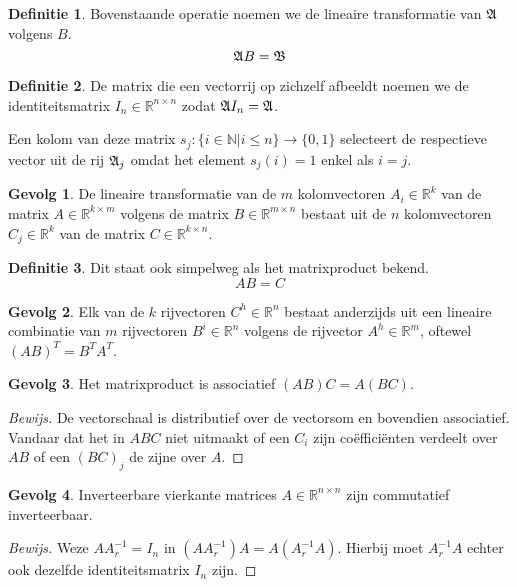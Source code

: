 \documentclass{amsart}
\theoremstyle{definition}
\newtheorem{dfn}{Definitie}[section]
\newtheorem{csq}{Gevolg}[section]
\newenvironment{bewijs}{\begin{proof}[Bewijs]}{\end{proof}}
\newcommand{\realnums}{\mathbb{R}}
\newcommand{\realn}[1][n]{\realnums^{#1}}
\newcommand{\realmx}[2][n]{\realn[#2 \times #1]}
\newcommand{\realnxn}{\realmx{n}}
\newcommand{\realmxn}{\realmx{m}}
\newcommand{\vecrow}[1][a]{\mathfrak{\MakeUppercase{#1}}}
\newcommand{\rvec}[2][i]{{#2}_{#1}}
\newcommand{\rvecr}[2][i]{\rvec[#1]{\vecrow[#2]}}
\newcommand{\rveci}[1][i]{\rvecr[#1]{a}}
\begin{document}
\begin{dfn}
	Bovenstaande operatie noemen we de lineaire transformatie van $\vecrow$ volgens $B$.
	\begin{equation*}
		\vecrow B = \vecrow[b]
	\end{equation*}
\end{dfn}

\begin{dfn}
	De matrix die een vectorrij op zichzelf afbeeldt noemen we de identiteitsmatrix $I_n \in \realnxn$ zodat $\vecrow I_n = \vecrow$.

	Een kolom van deze matrix $s_j: \{i \in \mathbb N|i\leq n\}\longrightarrow\{0,1\}$ selecteert de respectieve vector uit de rij $\rveci[j]$ omdat het element $s_j(i) = 1$ enkel als $i = j$.
\end{dfn}

\begin{csq}
	De lineaire transformatie van de $m$ kolomvectoren $A_i \in \realn[k]$ van de matrix $A \in \realmx[m]{k}$ volgens de matrix $B \in \realmxn$ bestaat uit de $n$ kolomvectoren $C_j \in \realn[k]$ van de matrix $C \in \realmx[n]{k}$.
\end{csq}

\begin{dfn}
	Dit staat ook simpelweg als het matrixproduct bekend.
	\begin{equation*}
		AB = C
	\end{equation*}
\end{dfn}

\begin{csq}
	Elk van de $k$ rijvectoren $C^h \in \realn$ bestaat anderzijds uit een lineaire combinatie van $m$ rijvectoren $B^i \in \realn$ volgens de rijvector $A^h \in \realn[m]$, oftewel $(AB)^T = B^TA^T$.
\end{csq}

\begin{csq}
	Het matrixproduct is associatief $(AB)C = A(BC)$.
	\begin{bewijs}
		De vectorschaal is distributief over de vectorsom en bovendien associatief.
		Vandaar dat het in $ABC$ niet uitmaakt of een $C_i$ zijn coëfficiënten verdeelt over $AB$ of een $(BC)_j$ de zijne over $A$.
	\end{bewijs}
\end{csq}

\begin{csq}
	Inverteerbare vierkante matrices $A \in \realnxn$ zijn commutatief inverteerbaar.
	\begin{bewijs}
		Weze $AA^{-1}_r = I_n$ in $(AA^{-1}_r)A = A(A^{-1}_rA)$. Hierbij moet $A^{-1}_rA$ echter ook dezelfde identiteitsmatrix $I_n$ zijn.
	\end{bewijs}
\end{csq}
\end{document}
